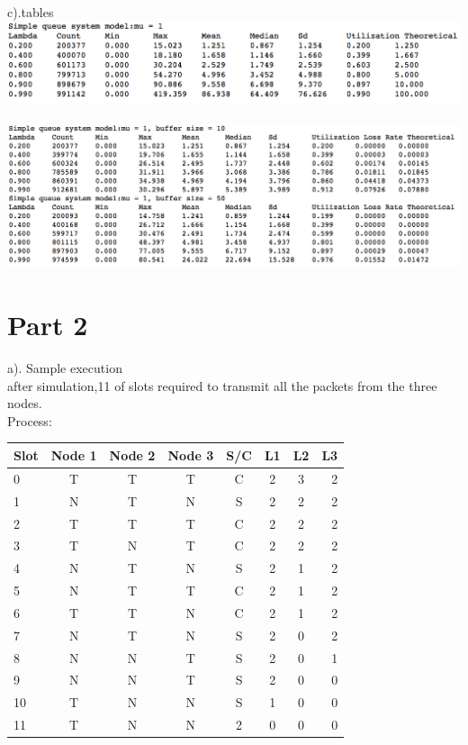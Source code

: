 \documentclass[paper=a4, fontsize=11pt]{scrartcl}
\numberwithin{equation}{section} %
\numberwithin{figure}{section} %
\numberwithin{table}{section} %
\begin{document}
       c).tables\\
        \includegraphics[scale=0.5]{b}\\\\
        \includegraphics[scale=0.5]{a}
    
\section{Part 2}
    a). Sample execution\\
        after simulation,11 of slots required to transmit all the packets from the three nodes.\\
        Process:\\ 
        \begin{tabular}{l*{6}{c}r}
Slot              & Node 1 & Node 2 & Node 3 & S/C&L1   &L2   &L3  \\
\hline
0                 & T      & T      & T      & C  &2   &3   &2  \\
1                 & N      & T      & N      & S  &2   &2   &2  \\
2                 & T      & T      & T      & C  &2   &2   &2   \\
3                 & T      & N      & T      & C  &2   &2   &2  \\
4                 & N      & T      & N      & S  &2   &1   &2   \\
5                 & N      & T      & T      & C  &2   &1   &2  \\
6                 & T      & T      & N      & C  &2   &1   &2  \\
7                 & N      & T      & N      & S  &2   &0   &2  \\
8                 & N      & N      & T      & S  &2   &0   &1   \\
9                 & N      & N      & T      & S  &2   &0   &0 \\
10                & T      & N      & N      & S  &1   &0   &0 \\
11                & T      & N      & N      & 2  &0   &0   &0   \\
\end{tabular}
\end{document}
